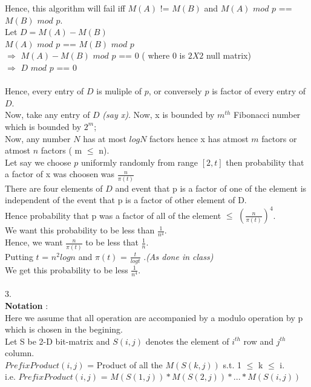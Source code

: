 \documentclass{article}
\begin{document}
Hence, this algorithm will fail iff $M(A)$ != $M(B)$ and $M(A)$ $mod$ $p$ == $M(B)$ $mod$ $p$. \\ 
Let $D = M(A) - M(B)$ \\ 
$M(A)$ $mod$ $p$ == $M(B)$ $mod$ $p$ \\
$\Longrightarrow$ $M(A) - M(B)$ $mod$ $p$ == $0$ ( where $0$ is $2 X 2$ null matrix) \\
$\Longrightarrow$ $D$ $mod$ $p$ == $0$ \\\\
Hence, every entry of $D$ is muliple of $p$, or conversely $p$ is factor of every entry of $D$. \\
Now, take any entry of $D$ \textit{(say x)}. Now, x is bounded by $m^{th}$ Fibonacci number which is bounded by $2^{m}$; \\
Now, any number $N$ has at most $logN$ factors hence x has atmost $m$ factors or atmost $n$ factors ( m $\leq$ n). \\ 
Let say we choose $p$ uniformly randomly from range $[2,t]$ then probability that a factor of x was choosen was $\frac{n}{\pi(t)}$ \\
There are four elements of $D$ and event that p is a factor of one of the element is independent of the event that p is a factor of other element of D. \\ 
Hence probability that p was a factor of all of the element $\leq$ 
$(\frac{n}{\pi(t)})^{4}$.\\ 
We want this probability to be less than $\frac{1}{n^{4}}$. \\
Hence, we want $\frac{n}{\pi(t)}$ to be less that $\frac{1}{n}$. \\ 
Putting $t$ = $n^{2}logn$ 
and $\pi(t)$ = $\frac{t}{logt}$ .\hfill{\textit{(As done in class)} }   \\
We get this probability to be less $\frac{1}{n^{4}}$.\\\\
3. \\
\textbf{Notation} : \\
Here we assume that all operation are accompanied by a modulo operation by p which is chosen in the begining. \\ 
Let S be 2-D bit-matrix and $S(i,j)$ denotes the element of $i^{th}$ row and $j^{th}$ column. \\
$PrefixProduct(i,j)$ = Product of all the $M(S(k,j))$ s.t. 1 $\leq$ k $\leq$ i. \\
i.e. $PrefixProduct(i,j)$ = $M(S(1,j)) * M(S(2,j)) * ... * M(S(i,j))$\\
\end{document}
